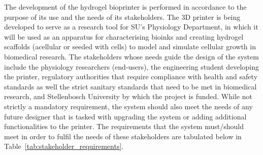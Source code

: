 The development of the hydrogel bioprinter is performed in accordance to the purpose of its use and the needs of its stakeholders. The 3D printer is being developed to serve as a research tool for SU's Physiology Department, in which it will be used as an apparatus for characterising bioinks and creating hydrogel scaffolds (acellular or seeded with cells) to model and simulate cellular growth in biomedical research. The stakeholders whose needs guide the design of the system include the physiology researchers (end-users), the engineering student developing the printer, regulatory authorities that require compliance with health and safety standards as well the strict sanitary standards that need to be met in biomedical research, and Stellenbosch University by which the project is funded. While not strictly a mandatory requirement, the system should also meet the needs of any future designer that is tasked with upgrading the system or adding additional functionalities to the printer. The requirements that the system must/should meet in order to fulfil the needs of these stakeholders are tabulated below in Table~\ref{tab:stakeholder_requirements}.
\vspace{5cm}
\small
